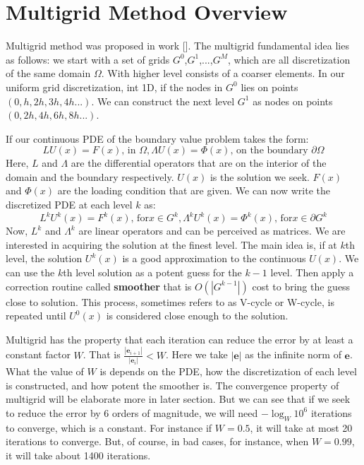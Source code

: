 \section{Multigrid Method Overview}
Multigrid method was proposed in work [\cite{brandt1977multi}]. The multigrid fundamental idea lies as follows: we start with a set of grids $G^0$,$G^1$,...,$G^M$, which are all discretization of the same domain $\Omega$. With higher level consists of a coarser elements. In our uniform grid discretization, int 1D, if the nodes in $G^0$ lies on points $(0,h,2h,3h,4h...)$. We can construct the next level $G^1$ as nodes on points $(0,2h,4h,6h,8h...)$.

If our continuous PDE of the boundary value problem takes the form:
\begin{equation}
LU(x) = F(x)\text{, in }\Omega,  \Lambda U(x) = \Phi(x)\text{, on the boundary }\partial\Omega
\end{equation}
Here, $L$ and $\Lambda$ are the differential operators that are on the interior of the domain and the boundary respectively. $U(x)$ is the solution we seek. $F(x)$ and $\Phi(x)$ are the loading condition that are given. We can now write the discretized PDE at each level $k$ as:
\begin{equation}\label{equ:mg_operator}
L^kU^k(x) = F^k(x)\text{, for} x \in G^k,  \Lambda^k U^k(x) = \Phi^k(x)\text{, for} x\in\partial G^k 
\end{equation}
Now, $L^k$ and $\Lambda^k$ are linear operators and can be perceived as matrices. We are interested in acquiring the solution at the finest level. The main idea is, if at $k$th level, the solution $U^k(x)$ is a good approximation to the continuous $U(x)$. We can use the $k$th level solution as a potent guess for the $k-1$ level. Then apply a correction routine called \textbf{smoother} that is $O(|G^{k-1}|)$ cost to bring the guess close to solution. This process, sometimes refers to as V-cycle or W-cycle, is repeated until $U^0(x)$ is considered close enough to the solution. 

Multigrid has the property that each iteration can reduce the error by at least a constant factor $W$. That is $\frac{|\mathbf{e}_{i+1}|}{|\mathbf{e}_{i}|}<W$. Here we take $|\mathbf{e}|$ as the infinite norm of $\mathbf{e}$. What the value of $W$ is depends on the PDE, how the discretization of each level is constructed, and how potent the smoother is. The convergence property of multigrid will  be elaborate more in later section. But we can see that if we seek to reduce the error by 6 orders of magnitude, we will need $-\log_W 10^6$ iterations to converge, which is a constant. For instance if $W = 0.5$, it will take at most 20 iterations to converge. But, of course, in bad cases, for instance, when $W = 0.99$, it will take about 1400 iterations.


